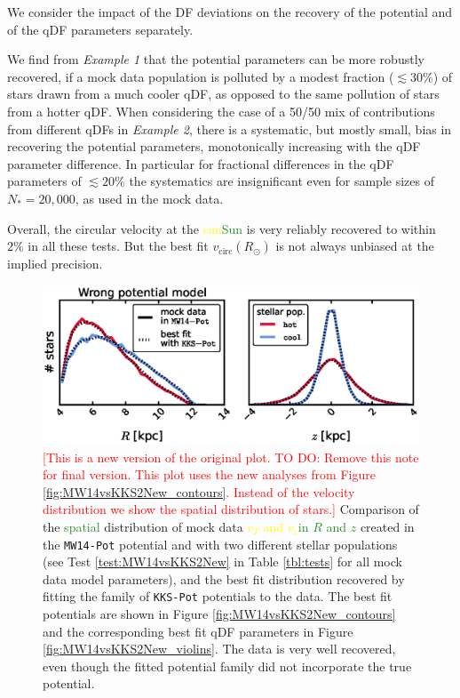 \documentclass[iop,revtex4,numberedappendix,appendixfloats]{emulateapj}
\newcommand{\NEW}[1]{\textcolor{ForestGreen}{#1}}
\newcommand{\OLD}[1]{\textcolor{Yellow}{#1}}%
\newcommand{\NOTE}[1]{\textcolor{Red}{#1}}
\begin{document}
We consider the impact of the DF deviations on the recovery of the potential and of the qDF parameters separately. 

We find from \emph{Example 1} that the potential parameters can be more robustly recovered, if a mock data population is polluted by a modest fraction ($\lesssim 30\%$) of stars drawn from a much cooler qDF, as opposed to the same pollution of stars from a hotter qDF. When considering the case of a 50/50 mix of contributions from different qDFs in \emph{Example 2}, there is a systematic, but mostly small, bias in recovering the potential parameters, monotonically increasing with the qDF parameter difference. In particular for fractional differences in the qDF parameters of $\lesssim 20\%$ the systematics are insignificant even for sample sizes of $N_{*} = 20,000$, as used in the mock data.

Overall, the circular velocity at the \OLD{sun}\NEW{Sun} is very reliably recovered to within $2\%$ in all these tests. But the best fit $v_\text{circ}(R_\odot)$ is not always unbiased at the implied precision.

\begin{figure}[!htbp]
\centering
\includegraphics[width=\columnwidth]{figs/MW14vsKKS2New_mockdata_residuals.eps}
\caption{\NOTE{[This is a new version of the original plot. TO DO: Remove this note for final version. This plot uses the new analyses from Figure \ref{fig:MW14vsKKS2New_contours}. Instead of the velocity distribution we show the spatial distribution of stars.]} Comparison of the \NEW{spatial} distribution of mock data \OLD{$v_T$ and $v_z$}\NEW{in $R$ and $z$} created in the \texttt{MW14-Pot} potential and with two different stellar populations (see Test \ref{test:MW14vsKKS2New} in Table \ref{tbl:tests} for all mock data model parameters), and the best fit distribution recovered by fitting the family of \texttt{KKS-Pot} potentials to the data. The best fit potentials are shown in Figure \ref{fig:MW14vsKKS2New_contours} and the corresponding best fit qDF parameters in Figure \ref{fig:MW14vsKKS2New_violins}. The data is very well recovered, even though the fitted potential family did not incorporate the true potential.}
\label{fig:MW14vsKKS2New_mockdata_residuals}
\end{figure}
\end{document}
